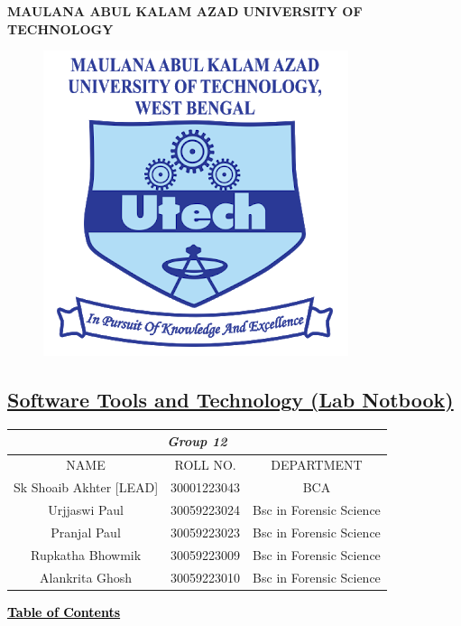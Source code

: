 \documentclass{article}
\begin{document}
\begin{center}
    \huge\textbf{MAULANA ABUL KALAM AZAD UNIVERSITY OF TECHNOLOGY}\\

\end{center}
\begin{figure}[h!]
    \centering
    \includegraphics[width=0.3\linewidth]{makaut.png}
\end{figure}
\date{\today} 
\begin{center}
    \section*{\textbf{\underline{Software Tools and Technology (Lab Notbook)}}}
    \vspace{0.4cm}
\end{center}
\begin{center}

\vspace{0.2 cm}
\renewcommand{\arraystretch}{2}
\hspace*{0.08in}
\begin{tabular}{ |c|c|c| }
\hline
\multicolumn{3}{|c|}{\Large \textbf{\textit{Group 12}}} \\
\hline
NAME & ROLL NO.& DEPARTMENT \\
\hline
Sk Shoaib Akhter [LEAD]& 30001223043& BCA \\
\hline
Urjjaswi Paul& 30059223024& Bsc in Forensic Science\\
\hline
Pranjal Paul& 30059223023& Bsc in Forensic Science\\
\hline
Rupkatha Bhowmik& 30059223009& Bsc in Forensic Science\\
\hline
Alankrita Ghosh& 30059223010& Bsc in Forensic Science\\
\hline
\end{tabular}

\end{center}
\newpage

\vspace{3cm} 
\begin{center}
    \Huge \textbf{\textcolor{black}{\underline{Table of Contents}}} 
\end{center}
\end{document}
